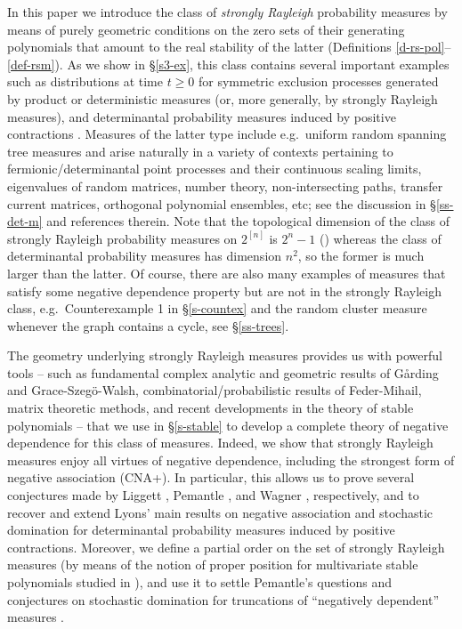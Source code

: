 \documentclass[10pt,reqno]{amsart}
\theoremstyle{plain}
\theoremstyle{definition}
\theoremstyle{remark}
\begin{document}
In this paper we introduce the class of {\em strongly Rayleigh} probability 
measures by means of purely geometric conditions on the 
zero sets of their generating polynomials that amount to the real
stability of the latter (Definitions \ref{d-rs-pol}--\ref{def-rsm}). 
As we show in \S \ref{s3-ex}, this class 
contains several important examples such as 
distributions at time $t\ge 0$ for symmetric exclusion
processes generated by product or deterministic measures \cite{L2} 
(or, more generally, by strongly Rayleigh measures), 
and determinantal probability measures induced by positive contractions
\cite{BKPV,Lyons}. 
Measures of the latter type include e.g.~uniform random spanning tree 
measures \cite{BP,Lyons} and arise naturally in a variety of contexts 
pertaining to fermionic/determinantal point processes and their continuous 
scaling limits, eigenvalues of random matrices, number theory,
non-intersecting paths, transfer current matrices, orthogonal polynomial
ensembles, etc; see the discussion in \S \ref{ss-det-m} and 
references therein. 
Note that the topological dimension
of the class of strongly Rayleigh probability measures on $2^{[n]}$ is $2^n-1$ 
(\cite[Lemma~4.1]{BB}) whereas 
the class of determinantal probability measures has 
dimension $n^2$, so the 
former is much larger than the latter. Of course, there are also  
many examples of measures that satisfy some negative dependence property but 
are not in the strongly Rayleigh class, e.g.~Counterexample 1 in 
\S \ref{s-countex} and the random cluster measure 
\cite{grimmett} whenever the graph contains a cycle, see \S \ref{ss-trees}. 

The geometry underlying strongly Rayleigh measures provides us with 
powerful tools -- 
such as fundamental complex analytic and geometric
results of G\aa rding and Grace-Szeg\"o-Walsh, combinatorial/probabilistic
results of Feder-Mihail, matrix theoretic methods, and recent developments in 
the theory of
stable polynomials \cite{BBS,BBS1,BBS2,PB} -- that we use in 
\S \ref{s-stable} to develop a complete theory of negative dependence for
this class of measures. Indeed, we show that 
strongly Rayleigh measures enjoy all virtues of negative
dependence, including the strongest form of negative association (CNA+). 
In particular, this allows us to prove 
several conjectures made by Liggett \cite{L2}, Pemantle \cite{P}, and 
Wagner \cite{W}, 
respectively, and to recover and extend Lyons' main results \cite{Lyons} on 
negative
association and stochastic domination for determinantal 
probability measures induced by positive contractions. Moreover, we define a
partial order on the set of strongly Rayleigh measures (by means of the 
notion of proper position for multivariate stable polynomials studied in
\cite{BBS,BBS1,BBS2,PB}), and use it to settle Pemantle's questions and
conjectures on stochastic domination for truncations of
``negatively dependent'' measures \cite{P}. 
\end{document}
